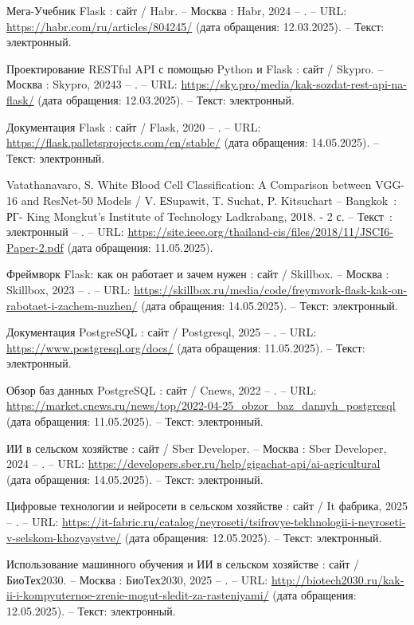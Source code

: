 \begin{thebibliography}{9}
	 Мега-Учебник Flask : сайт / Habr. – Москва : Habr, 2024 – . – URL: \url{https://habr.com/ru/articles/804245/} (дата обращения: 12.03.2025). – Текст: электронный.
	
	 Проектирование RESTful API с помощью Python и Flask : сайт / Skypro. – Москва : Skypro, 20243 – . – URL: \url{https://sky.pro/media/kak-sozdat-rest-api-na-flask/} (дата обращения: 12.03.2025). – Текст: электронный.
	
	 Документация Flask : сайт / Flask, 2020 – . – URL: \url{https://flask.palletsprojects.com/en/stable/} (дата обращения: 14.05.2025). – Текст: электронный.
	
	 Vatathanavaro, S. White Blood Cell Classification: A Comparison between VGG-16 and ResNet-50 Models / V. ЕSupawit, T. Suchat, P. Kitsuchart  – Bangkok~: РГ- King Mongkut’s Institute of Technology Ladkrabang, 2018. - 2 с. – Текст~: электронный – . – URL: \url{https://site.ieee.org/thailand-cis/files/2018/11/JSCI6-Paper-2.pdf} (дата обращения: 11.05.2025).
		
	 Фреймворк Flask: как он работает и зачем нужен : сайт / Skillbox. – Москва : Skillbox, 2023 – . – URL: \url{https://skillbox.ru/media/code/freymvork-flask-kak-on-rabotaet-i-zachem-nuzhen/} (дата обращения: 14.05.2025). – Текст: электронный.
	
	 Документация PostgreSQL : сайт / Postgresql, 2025 – . – URL: \url{https://www.postgresql.org/docs/} (дата обращения: 11.05.2025). – Текст: электронный.
	
	 Обзор баз данных PostgreSQL : сайт / Cnews, 2022 – . – URL: \url{https://market.cnews.ru/news/top/2022-04-25_obzor_baz_dannyh_postgresql} (дата обращения: 11.05.2025). – Текст: электронный.
	
	 ИИ в сельском хозяйстве : сайт / Sber Developer. – Москва : Sber Developer, 2024 – . – URL: \url{https://developers.sber.ru/help/gigachat-api/ai-agricultural} (дата обращения: 14.05.2025). – Текст: электронный.
	
	 Цифровые технологии и нейросети в сельском хозяйстве : сайт / It фабрика, 2025 – . – URL: \url{https://it-fabric.ru/catalog/neyroseti/tsifrovye-tekhnologii-i-neyroseti-v-selskom-khozyaystve/} (дата обращения: 12.05.2025). – Текст: электронный.
	
	 Использование машинного обучения и ИИ в сельском хозяйстве : сайт / БиоТех2030. – Москва : БиоТех2030, 2025 – . – URL: \url{http://biotech2030.ru/kak-ii-i-kompyuternoe-zrenie-mogut-sledit-za-rasteniyami/} (дата обращения: 12.05.2025). – Текст: электронный.
	



\end{thebibliography}
